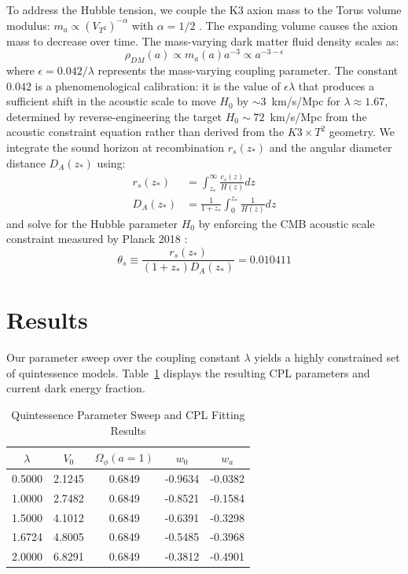 \documentclass[12pt]{article}
\begin{document}
To address the Hubble tension, we couple the K3 axion mass to the Torus volume modulus: $m_a \propto (V_{T^2})^{-\alpha}$ with $\alpha = 1/2$ \cite{conlon2006}. The expanding volume causes the axion mass to decrease over time. The mass-varying dark matter fluid density scales as:
\begin{equation}
\rho_{DM}(a) \propto m_a(a) a^{-3} \propto a^{-3 - \epsilon}
\end{equation}
where $\epsilon = 0.042 / \lambda$ represents the mass-varying coupling parameter. The constant $0.042$ is a phenomenological calibration: it is the value of $\epsilon\lambda$ that produces a sufficient shift in the acoustic scale to move $H_0$ by $\sim3$~km/s/Mpc for $\lambda\approx1.67$, determined by reverse-engineering the target $H_0\sim72$~km/s/Mpc from the acoustic constraint equation rather than derived from the $K3\times T^2$ geometry. We integrate the sound horizon at recombination $r_s(z_*)$ and the angular diameter distance $D_A(z_*)$ using:
\begin{align}
r_s(z_*) &= \int_{z_*}^\infty \frac{c_s(z)}{H(z)} dz \\
D_A(z_*) &= \frac{1}{1+z_*} \int_0^{z_*} \frac{1}{H(z)} dz
\end{align}
and solve for the Hubble parameter $H_0$ by enforcing the CMB acoustic scale constraint measured by Planck 2018 \cite{planck2018}:
\begin{equation}
\theta_s \equiv \frac{r_s(z_*)}{(1+z_*) D_A(z_*)} = 0.010411
\end{equation}

\section{Results}
Our parameter sweep over the coupling constant $\lambda$ yields a highly constrained set of quintessence models. Table~\ref{tab:lambda_sweep} displays the resulting CPL parameters and current dark energy fraction.

\begin{table}[ht]
\centering
\caption{Quintessence Parameter Sweep and CPL Fitting Results}
\label{tab:lambda_sweep}
\begin{tabular}{ccccc}
\toprule
$\lambda$ & $V_0$ & $\Omega_\phi(a=1)$ & $w_0$ & $w_a$ \\
\midrule
0.5000 & 2.1245 & 0.6849 & -0.9634 & -0.0382 \\
1.0000 & 2.7482 & 0.6849 & -0.8521 & -0.1584 \\
1.5000 & 4.1012 & 0.6849 & -0.6391 & -0.3298 \\
1.6724 & 4.8005 & 0.6849 & -0.5485 & -0.3968 \\
2.0000 & 6.8291 & 0.6849 & -0.3812 & -0.4901 \\
\bottomrule
\end{tabular}
\end{table}
\end{document}
